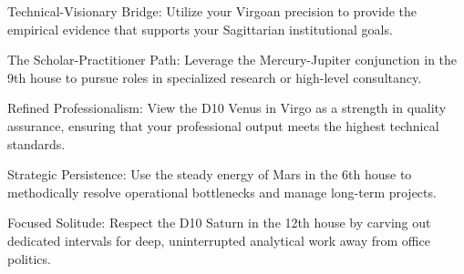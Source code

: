 \begin{diamondlist}
  \item {\fontsize{8.5}{12}\selectfont Technical-Visionary Bridge: Utilize your Virgoan precision to provide the empirical evidence that supports your Sagittarian institutional goals.}
  \item {\fontsize{8.5}{12}\selectfont The Scholar-Practitioner Path: Leverage the Mercury-Jupiter conjunction in the 9th house to pursue roles in specialized research or high-level consultancy.}
  \item {\fontsize{8.5}{12}\selectfont Refined Professionalism: View the D10 Venus in Virgo as a strength in quality assurance, ensuring that your professional output meets the highest technical standards.}
  \item {\fontsize{8.5}{12}\selectfont Strategic Persistence: Use the steady energy of Mars in the 6th house to methodically resolve operational bottlenecks and manage long-term projects.}
  \item {\fontsize{8.5}{12}\selectfont Focused Solitude: Respect the D10 Saturn in the 12th house by carving out dedicated intervals for deep, uninterrupted analytical work away from office politics.}
\end{diamondlist}


